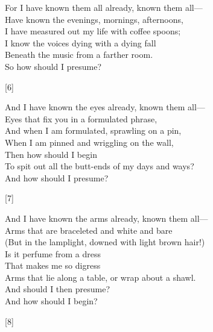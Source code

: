 \documentclass{article}
\begin{document}
\begin{minipage}{8cm}
    For I have known them all already, known them all---\\
    Have known the evenings, mornings, afternoons,\\
    I have measured out my life with coffee spoons;\\
    I know the voices dying with a dying fall\\
    Beneath the music from a farther room.\\
    \hspace{10mm}So how should I presume?
    \begin{center}[6]\end{center}
\end{minipage}

\begin{minipage}{8cm}
    And I have known the eyes already, known them all---\\
    Eyes that fix you in a formulated phrase,\\
    And when I am formulated, sprawling on a pin,\\
    When I am pinned and wriggling on the wall,\\
    Then how should I begin\\
    To spit out all the butt-ends of my days and ways?\\
    \quad{}And how should I presume?
    \begin{center}[7]\end{center}
\end{minipage}

\begin{minipage}{9cm}
    And I have known the arms already, known them all---\\
    Arms that are braceleted and white and bare\\
    (But in the lamplight, downed with light brown hair!)\\
    Is it perfume from a dress\\
    That makes me so digress\\
    Arms that lie along a table, or wrap about a shawl.\\
    \quad{}And should I then presume?\\
    \quad{}And how should I begin?
    \begin{center}[8]\end{center}
\end{minipage}

\dotfill
\end{document}
